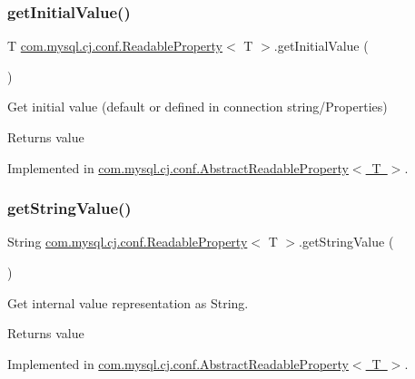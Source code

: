 \subsubsection{\texorpdfstring{get\+Initial\+Value()}{getInitialValue()}}
{\footnotesize\ttfamily T \mbox{\hyperlink{interfacecom_1_1mysql_1_1cj_1_1conf_1_1_readable_property}{com.\+mysql.\+cj.\+conf.\+Readable\+Property}}$<$ T $>$.get\+Initial\+Value (\begin{DoxyParamCaption}{ }\end{DoxyParamCaption})}

Get initial value (default or defined in connection string/\+Properties)

\begin{DoxyReturn}{Returns}
value 
\end{DoxyReturn}


Implemented in \mbox{\hyperlink{classcom_1_1mysql_1_1cj_1_1conf_1_1_abstract_readable_property_a8848d72c6bd0795fe6585242d546f050}{com.\+mysql.\+cj.\+conf.\+Abstract\+Readable\+Property$<$ T $>$}}.

\mbox{\label{interfacecom_1_1mysql_1_1cj_1_1conf_1_1_readable_property_a33c24e6ce00a092c5ab1929d241110ba}} 
\subsubsection{\texorpdfstring{get\+String\+Value()}{getStringValue()}}
{\footnotesize\ttfamily String \mbox{\hyperlink{interfacecom_1_1mysql_1_1cj_1_1conf_1_1_readable_property}{com.\+mysql.\+cj.\+conf.\+Readable\+Property}}$<$ T $>$.get\+String\+Value (\begin{DoxyParamCaption}{ }\end{DoxyParamCaption})}

Get internal value representation as String.

\begin{DoxyReturn}{Returns}
value 
\end{DoxyReturn}


Implemented in \mbox{\hyperlink{classcom_1_1mysql_1_1cj_1_1conf_1_1_abstract_readable_property_a2a7a4ec0038e77928d07df31a52e3e8a}{com.\+mysql.\+cj.\+conf.\+Abstract\+Readable\+Property$<$ T $>$}}.


